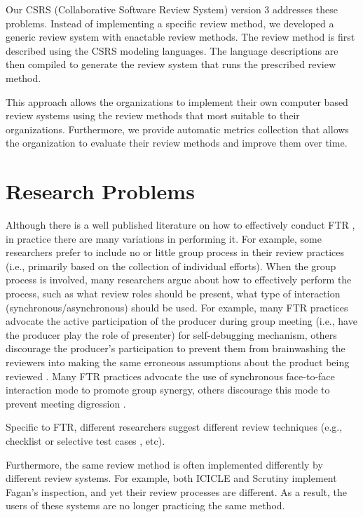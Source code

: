 Our CSRS (Collaborative Software Review System) version 3 addresses
these problems. Instead of implementing a specific review 
method, we developed a generic review system with enactable review
methods. The review method is first described using the CSRS modeling 
languages. The language descriptions are then compiled to generate the
review system that runs the prescribed review method. 

This approach allows the organizations to implement their own computer
based review systems using the review methods that most suitable to their
organizations. Furthermore, we provide 
automatic metrics collection that allows the organization to
evaluate their review methods and improve them over time.


\section {Research Problems}

Although there is a well published literature on how to
effectively conduct FTR \cite{Fagan76}, in
practice there are many variations in performing it.
For example, some researchers prefer to include no or little group
process in their review practices (i.e., primarily based on the
collection of individual efforts)\cite{Votta93}.
When the group process is involved, many researchers argue about how
to effectively perform the process, such as what review roles should be
present, what type of interaction (synchronous/asynchronous) should be
used. For example, 
many FTR practices advocate the active participation of the producer 
during group meeting (i.e., have the producer play the role of
presenter) for self-debugging mechanism, others discourage
the producer's participation to prevent them from brainwashing the
reviewers into making the same erroneous assumptions about the product
being reviewed \cite{Myers79,Ackerman89}.
Many FTR practices advocate the use of 
synchronous face-to-face interaction mode to promote group synergy,
others discourage this mode to prevent meeting digression
\cite{Nunamaker91,Mashayekhi94}. 

Specific to FTR, different researchers suggest different review
techniques (e.g., checklist \cite{Fagan76,Humphrey90} or
selective test cases \cite{Ackerman89}, etc).

Furthermore, the same review method is often implemented differently
by different review systems. For example, both
ICICLE \cite{Brothers90} and Scrutiny \cite{Gintell93} implement
Fagan's inspection, and yet their review processes are different.
As a result, the users of these systems are no longer practicing the
same method. 

